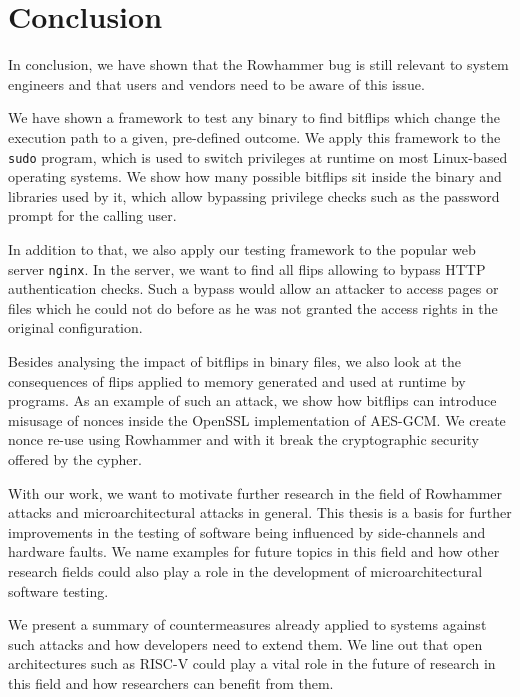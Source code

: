 \chapter{Conclusion}\label{sec:conclusion}

In conclusion, we have shown that the Rowhammer bug is still relevant to system
engineers and that users and vendors need to be aware of this issue.

We have shown a framework to test any binary to find bitflips which change the
execution path to a given, pre-defined outcome. We apply this framework to the
\texttt{sudo} program, which is used to switch privileges at runtime on most
Linux-based operating systems. We show how many possible bitflips sit inside the
binary and libraries used by it, which allow bypassing privilege checks such as
the password prompt for the calling user.

In addition to that, we also apply our testing framework to the popular web
server \texttt{nginx}. In the server, we want to find all flips allowing to
bypass HTTP authentication checks. Such a bypass would allow an attacker to
access pages or files which he could not do before as he was not granted the
access rights in the original configuration.

Besides analysing the impact of bitflips in binary files, we also look at the
consequences of flips applied to memory generated and used at runtime by
programs. As an example of such an attack, we show how bitflips can introduce
misusage of nonces inside the OpenSSL implementation of AES-GCM. We create nonce
re-use using Rowhammer and with it break the cryptographic security offered by
the cypher.

With our work, we want to motivate further research in the field of Rowhammer
attacks and microarchitectural attacks in general. This thesis is a basis for
further improvements in the testing of software being influenced by
side-channels and hardware faults. We name examples for future topics in this
field and how other research fields could also play a role in the development of
microarchitectural software testing.

We present a summary of countermeasures already applied to systems against such
attacks and how developers need to extend them. We line out that open
architectures such as RISC-V could play a vital role in the future of research
in this field and how researchers can benefit from them.

